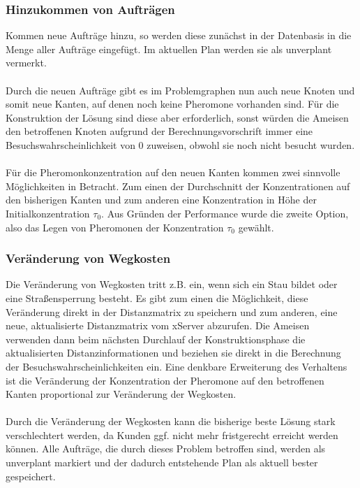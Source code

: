 \subsubsection{Hinzukommen von Aufträgen}
Kommen neue Aufträge hinzu, so werden diese zunächst in der Datenbasis in die Menge aller Aufträge eingefügt. Im aktuellen Plan werden sie als unverplant vermerkt. \\
\\
Durch die neuen Aufträge gibt es im Problemgraphen nun auch neue Knoten und somit neue Kanten, auf denen noch keine Pheromone vorhanden sind. Für die Konstruktion der Lösung sind diese aber erforderlich, sonst würden die Ameisen den betroffenen Knoten aufgrund der Berechnungsvorschrift  immer eine Besuchswahrscheinlichkeit von $0$ zuweisen, obwohl sie noch nicht besucht wurden. \\
\\
Für die Pheromonkonzentration auf den neuen Kanten kommen zwei sinnvolle Mög\-lich\-kei\-ten in Betracht. Zum einen der Durchschnitt der Konzentrationen auf den bisherigen Kanten und zum anderen eine Konzentration in Höhe der Initialkonzentration $\tau_0$. Aus Gründen der Performance wurde die zweite Option, also das Legen von Pheromonen der Konzentration $\tau_0$ gewählt.


\subsubsection{Veränderung von Wegkosten}
Die Veränderung von Wegkosten tritt z.B. ein, wenn sich ein Stau bildet oder eine Straßensperrung besteht. Es gibt zum einen die Möglichkeit, diese Veränderung direkt in der Distanzmatrix zu speichern und zum anderen, eine neue, aktualisierte Distanzmatrix vom xServer abzurufen. Die Ameisen verwenden dann beim nächsten Durchlauf der Konstruktionsphase die aktualisierten Distanzinformationen und beziehen sie direkt in die Berechnung der Besuchswahrscheinlichkeiten ein. Eine denkbare Erweiterung des Verhaltens ist die Veränderung der Konzentration der Pheromone auf den betroffenen Kanten proportional zur Veränderung der Wegkosten. \\
\\
Durch die Veränderung der Wegkosten kann die bisherige beste Lösung stark verschlechtert werden, da Kunden ggf. nicht mehr fristgerecht erreicht werden können. Alle Aufträge, die durch dieses Problem betroffen sind, werden als unverplant markiert und der dadurch entstehende Plan als aktuell bester gespeichert.